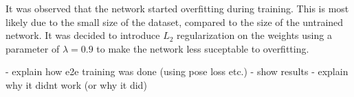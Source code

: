 It was observed that the network started overfitting during training.
This is most likely due to the small size of the dataset, compared to the size of the untrained network.
It was decided to introduce $L_2$ regularization on the weights using a parameter of $\lambda = 0.9$ to make the network less suceptable to overfitting.

- explain how e2e training was done (using pose loss etc.)
- show results
- explain why it didnt work (or why it did)


